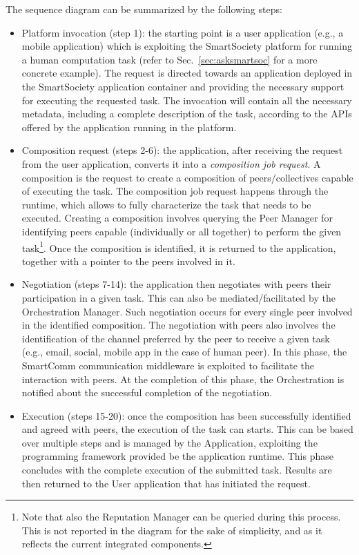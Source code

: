 The sequence diagram can be summarized by the following steps:
\begin{itemize}
\item Platform invocation (step 1): the starting point is a user application (e.g., a mobile application) which is exploiting the SmartSociety platform for running a human computation task (refer to Sec.~\ref{sec:asksmartsoc} for a more concrete example). The request is directed towards an application deployed in the SmartSociety application container and providing the necessary support for executing the requested task. The invocation will contain all the necessary metadata, including a complete description of the task, according to the APIs offered by the application running in the platform.

\item Composition request (steps 2-6): the application, after receiving the request from the user application, converts it into a \textit{composition job request}. A composition is the request to create a composition of peers/collectives capable of executing the task. The composition job request happens through %
the runtime, which allows to fully characterize the task that needs to be executed. Creating a composition involves querying the Peer Manager for identifying peers capable (individually or all together) to perform the given task\footnote{Note that also the Reputation Manager can be queried during this process. This is not reported in the diagram for the sake of simplicity, and as it reflects the current integrated components.}. Once the composition is identified, it is returned to the application, together with a pointer to the peers involved in it.

\item  Negotiation (steps 7-14): the application then negotiates with peers their participation in a given task. This can also be mediated/facilitated by the Orchestration Manager. Such negotiation occurs for every single peer involved in the identified composition. The negotiation with peers also involves the identification of the channel preferred by the peer to receive a given task (e.g., email, social, mobile app in the case of human peer). In this phase, the SmartComm communication middleware is exploited to facilitate the interaction with peers. At the completion of this phase, the Orchestration is notified about the successful completion of the negotiation.

\item Execution (steps 15-20): once the composition has been successfully identified and agreed with peers, the execution of the task can starts. This can be based over multiple steps and is managed by the Application, exploiting the programming framework provided be the application runtime. This phase concludes with the complete execution of the submitted task. Results are then returned to the User application that has initiated the request.

\end{itemize}


